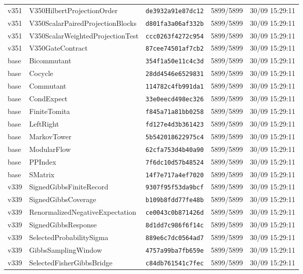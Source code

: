 \documentclass[11pt]{article}
\theoremstyle{definition}\newtheorem{deriv}{Derivação}
\begin{document}
{\begin{longtable}{@{}lllll@{}}
v351 & V350HilbertProjectionOrder & \texttt{de3932a91e87dc12} & 5899/5899 & 30/09 15:29:11 \\
v351 & V350ScalarPairedProjectionBlocks & \texttt{d801fa3a06af332b} & 5899/5899 & 30/09 15:29:11 \\
v351 & V350ScalarWeightedProjectionTest & \texttt{ccc0263f4272c954} & 5899/5899 & 30/09 15:29:11 \\
v351 & V350GateContract & \texttt{87cee74501af7cb2} & 5899/5899 & 30/09 15:29:11 \\
base & Bicommutant & \texttt{354f1a50e11c4c3d} & 5899/5899 & 30/09 15:29:11 \\
base & Cocycle & \texttt{28dd4546e6529831} & 5899/5899 & 30/09 15:29:11 \\
base & Commutant & \texttt{114782c4fb991da1} & 5899/5899 & 30/09 15:29:11 \\
base & CondExpect & \texttt{33e0eecd498ec326} & 5899/5899 & 30/09 15:29:11 \\
base & FiniteTomita & \texttt{f845a71a81bb0258} & 5899/5899 & 30/09 15:29:11 \\
base & LeftRight & \texttt{fd127e4d3b361423} & 5899/5899 & 30/09 15:29:11 \\
base & MarkovTower & \texttt{5b542018622975c4} & 5899/5899 & 30/09 15:29:11 \\
base & ModularFlow & \texttt{62cfa753d4b40a90} & 5899/5899 & 30/09 15:29:11 \\
base & PPIndex & \texttt{7f6dc10d57b48524} & 5899/5899 & 30/09 15:29:11 \\
base & SMatrix & \texttt{14f7e717a4ef7020} & 5899/5899 & 30/09 15:29:11 \\
v339 & SignedGibbsFiniteRecord & \texttt{9307f95f53da9bcf} & 5899/5899 & 30/09 15:29:11 \\
v339 & SignedGibbsCoverage & \texttt{b109b8fdd77fe48b} & 5899/5899 & 30/09 15:29:11 \\
v339 & RenormalizedNegativeExpectation & \texttt{ce0043c0b871426d} & 5899/5899 & 30/09 15:29:11 \\
v339 & SignedGibbsResponse & \texttt{8d1dd7c986f6f14c} & 5899/5899 & 30/09 15:29:11 \\
v339 & SelectedProbabilitySigma & \texttt{889e6c7dc0564ad7} & 5899/5899 & 30/09 15:29:11 \\
v339 & GibbsSamplingWindow & \texttt{4757a99ba7fb659e} & 5899/5899 & 30/09 15:29:11 \\
v339 & SelectedFisherGibbsBridge & \texttt{c84db761541c7fec} & 5899/5899 & 30/09 15:29:11 \\

\end{longtable}}
\end{document}
